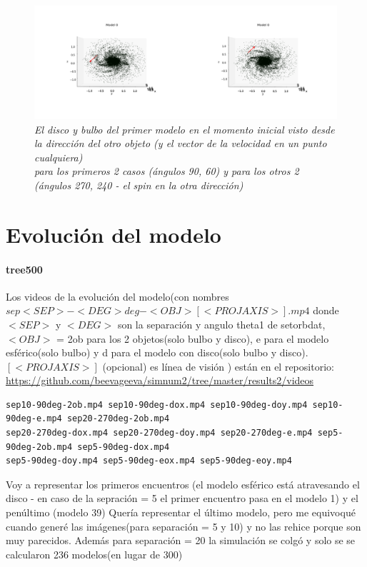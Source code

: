 \documentclass[12pt]{article} %
\renewcommand{\=}[1]{\stackrel{#1}{=}} %
\theoremstyle{definition}
\theoremstyle{remark}
\begin{document}
\begin{figure}[!ht]
 \centering
 \includegraphics[scale=0.2]{inimoddisco_sep5.png}
 \caption{\emph{El disco y bulbo del primer modelo en el momento inicial visto desde la dirección del otro objeto (y el vector de la velocidad en un punto cualquiera) \\
para los primeros 2 casos (ángulos 90, 60) y para los otros 2 (ángulos 270, 240 - el spin en la otra dirección)}}
\end{figure}





\newpage
\section*{Evolución del modelo}
\paragraph{tree500}

Los videos de la evolución del modelo(con nombres $sep<SEP>-<DEG>deg-<OBJ>[<PROJAXIS>].mp4$ donde $<SEP>$ y $<DEG>$ son la separación y angulo theta1 de setorbdat, $<OBJ>$ = 2ob para los 2 objetos(solo bulbo y disco), e para el modelo esférico(solo bulbo) y d para el modelo con disco(solo bulbo y disco). $[<PROJAXIS>]$ (opcional) es línea de visión )
están en el repositorio:
\url{https://github.com/beevageeva/simnum2/tree/master/results2/videos}
\small
\begin{verbatim}
sep10-90deg-2ob.mp4 sep10-90deg-dox.mp4 sep10-90deg-doy.mp4 sep10-90deg-e.mp4 sep20-270deg-2ob.mp4
sep20-270deg-dox.mp4 sep20-270deg-doy.mp4 sep20-270deg-e.mp4 sep5-90deg-2ob.mp4 sep5-90deg-dox.mp4
sep5-90deg-doy.mp4 sep5-90deg-eox.mp4 sep5-90deg-eoy.mp4
\end{verbatim}

\normalsize



Voy a representar los primeros encuentros (el modelo esférico está atravesando el disco - en caso de la sepración = 5 el primer encuentro pasa en el modelo 1) y el penúltimo (modelo 39)
\tiny Quería representar el último modelo, pero me equivoqué cuando generé las imágenes(para separación = 5 y 10) y no las rehice porque son muy parecidos. Además para separación = 20 la simulación se colgó y solo se se calcularon 236 modelos(en lugar de 300)
\end{document}
